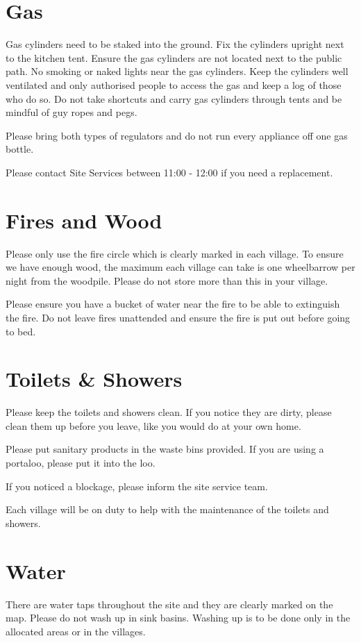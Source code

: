 \documentclass[a4paper, 11pt]{report}
\begin{document}
\section{Gas}
Gas cylinders need to be staked into the ground. Fix the cylinders upright next to the kitchen tent. Ensure the gas cylinders are not located next to the public path. No smoking or naked lights near the gas cylinders. Keep the cylinders well ventilated and only authorised people to access the gas and keep a log of those who do so. Do not take shortcuts and carry gas cylinders through tents and be mindful of guy ropes and pegs.\nl

Please bring both types of regulators and do not run every appliance off one gas bottle.\nl

Please contact Site Services between 11:00 - 12:00 if you need a replacement.

\section{Fires and Wood}
Please only use the fire circle which is clearly marked in each village. To ensure we have enough wood, the maximum each village can take is one wheelbarrow per night from the woodpile. Please do not store more than this in your village. \nl

Please ensure you have a bucket of water near the fire to be able to extinguish the fire. Do not leave fires unattended and ensure the fire is put out before going to bed.

\section{Toilets \& Showers}
Please keep the toilets and showers clean. If you notice they are dirty, please clean them up before you leave, like you would do at your own home.\nl

Please put sanitary products in the waste bins provided. If you are using a portaloo, please put it into the loo.\nl

If you noticed a blockage, please inform the site service team.\nl

Each village will be on duty to help with the maintenance of the toilets and showers. \nl

\section{Water}
There are water taps throughout the site and they are clearly marked on the map. Please do not wash up in sink basins. Washing up is to be done only in the allocated areas or in the villages.\nl
\end{document}

